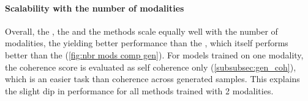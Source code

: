 \paragraph{Scalability with the number of modalities}
Overall, the , the  and the  methods scale equally well with the number of modalities, the  yielding better performance than the , which itself performs better than the  (\cref{fig:nbr mods comp gen}).
For models trained on one modality, the coherence score is evaluated as self coherence only (\cref{subsubsec:gen_coh}), which is an easier task than coherence across generated samples.
This explains the slight dip in performance for all methods trained with 2 modalities.


\begin{sansmath}
\end{sansmath}

